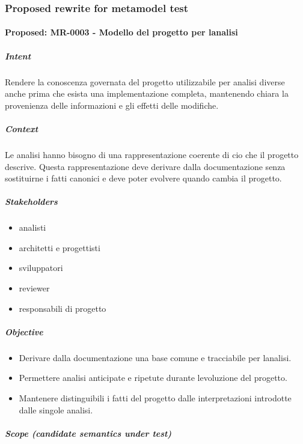 \documentclass[
  10pt,
]{article}
\providecommand{\tightlist}{%
  \setlength{\itemsep}{0pt}\setlength{\parskip}{0pt}}
\begin{document}
\subsubsection{Proposed rewrite for metamodel
test}\label{proposed-rewrite-for-metamodel-test-2}

\paragraph{Proposed: MR-0003 - Modello del progetto per
l\textquotesingle analisi}\label{proposed-mr-0003---modello-del-progetto-per-lanalisi}

\subparagraph{Intent}\label{intent-5}

Rendere la conoscenza governata del progetto utilizzabile per analisi
diverse anche prima che esista una implementazione completa, mantenendo
chiara la provenienza delle informazioni e gli effetti delle modifiche.

\subparagraph{Context}\label{context-5}

Le analisi hanno bisogno di una rappresentazione coerente di cio che il
progetto descrive. Questa rappresentazione deve derivare dalla
documentazione senza sostituirne i fatti canonici e deve poter evolvere
quando cambia il progetto.

\subparagraph{Stakeholders}\label{stakeholders-2}

\begin{itemize}
\tightlist
\item
  analisti
\item
  architetti e progettisti
\item
  sviluppatori
\item
  reviewer
\item
  responsabili di progetto
\end{itemize}

\subparagraph{Objective}\label{objective-2}

\begin{itemize}
\tightlist
\item
  Derivare dalla documentazione una base comune e tracciabile per
  l\textquotesingle analisi.
\item
  Permettere analisi anticipate e ripetute durante
  l\textquotesingle evoluzione del progetto.
\item
  Mantenere distinguibili i fatti del progetto dalle interpretazioni
  introdotte dalle singole analisi.
\end{itemize}

\subparagraph{Scope (candidate semantics under
test)}\label{scope-candidate-semantics-under-test-2}
\end{document}
